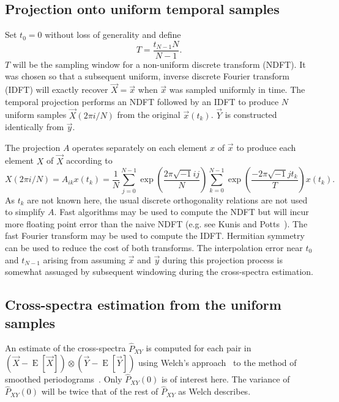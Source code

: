 \documentclass[letterpaper,11pt,nointlimits,reqno]{amsart}
\begin{document}
\subsection*{Projection onto uniform temporal samples}

Set $t_0=0$ without loss of generality and define
$$
T = \frac{t_{N-1} N}{N-1}.
$$
$T$ will be the sampling window for a non-uniform discrete transform (NDFT).
It was chosen so that a subsequent uniform, inverse discrete Fourier transform
(IDFT) will exactly recover $\vec{X}=\vec{x}$ when $\vec{x}$ was sampled
uniformly in time.  The temporal projection performs an NDFT followed by an
IDFT to produce $N$ uniform samples $\vec{X}\left(2\pi{}i/N\right)$ from the
original $\vec{x}\left(t_k\right)$.  $\vec{Y}$ is constructed identically from
$\vec{y}$.

The projection $A$ operates separately on each element $x$ of $\vec{x}$
to produce each element $X$ of $\vec{X}$ according to
$$
    X\left(2\pi{}i/N\right)
    =
    A_{ik} x\left(t_k\right)
    =
    \frac{1}{N}
    \sum_{j=0}^{N-1} \exp\left(\frac{ 2\pi\sqrt{-1} i j   }{N} \right)
    \sum_{k=0}^{N-1} \exp\left(\frac{-2\pi\sqrt{-1} j t_k }{T} \right)
    x\left(t_k\right)
.
$$
As $t_k$ are not known here, the usual discrete orthogonality relations are not
used to simplify $A$.  Fast algorithms may be used to compute the NDFT but will
incur more floating point error than the naive NDFT (e.g. see Kunis and
Potts~\cite{Kunis2008Time}).  The fast Fourier transform may be used to compute
the IDFT.  Hermitian symmetry can be used to reduce the cost of both
transforms.  The interpolation error near $t_0$ and $t_{N-1}$ arising from
assuming $\vec{x}$ and $\vec{y}$ during this projection process is somewhat
assuaged by subsequent windowing during the cross-spectra estimation.

\subsection*{Cross-spectra estimation from the uniform samples}

An estimate of the cross-spectra $\hat{P}_{XY}$ is computed for each pair in
$\left(\vec{X} - \operatorname{E}\left[\vec{X}\right]\right) \otimes
\left(\vec{Y} - \operatorname{E}\left[\vec{Y}\right]\right)$ using Welch's
approach~\cite{Welch1967Use} to the method of smoothed
periodograms~\cite{Bartlett1948Smoothing}.  Only $\hat{P}_{XY}(0)$ is of
interest here.  The variance of $\hat{P}_{XY}(0)$ will be twice that of the
rest of $\hat{P}_{XY}$ as Welch describes.
\end{document}
